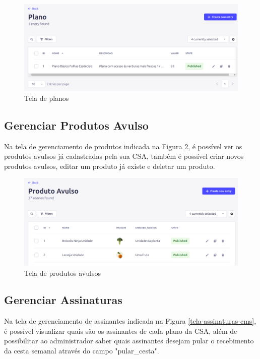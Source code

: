 \begin{figure}[h]
	\centering
	\includegraphics[keepaspectratio=true,scale=0.28]{figuras/painel_planos.png}
	\caption{Tela de planos}
        \label{tela-planos-cms}
\end{figure}

\subsection{Gerenciar Produtos Avulso}
Na tela de gerenciamento de produtos indicada na Figura \ref{tela-produtos-cms}, é possível ver os produtos avulsos já cadastradas pela sua CSA, também é possível criar novos produtos avulsos, editar um produto já existe e deletar um produto.

\begin{figure}[h]
	\centering
	\includegraphics[keepaspectratio=true,scale=0.28]{figuras/painel_produtos.png}
	\caption{Tela de produtos avulsos}
        \label{tela-produtos-cms}
\end{figure}

\subsection{Gerenciar Assinaturas}
Na tela de gerenciamento de assinantes indicada na Figura \ref{tela-assinaturas-cms}, é possível visualizar quais são os assinantes de cada plano da CSA, além de possibilitar ao administrador saber quais assinantes desejam pular o recebimento da cesta semanal através do campo "pular\_cesta".

